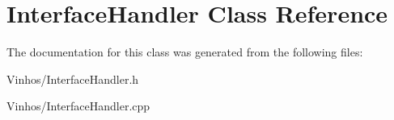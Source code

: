 \hypertarget{class_interface_handler}{}\section{Interface\+Handler Class Reference}
\label{class_interface_handler}


The documentation for this class was generated from the following files\+:\begin{DoxyCompactItemize}
\item 
Vinhos/Interface\+Handler.\+h\item 
Vinhos/Interface\+Handler.\+cpp\end{DoxyCompactItemize}
